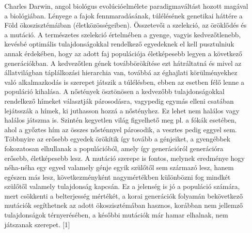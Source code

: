 


Charles Darwin, angol biológus evolúcióelmélete paradigmaváltást hozott magával a biológiában. 
Lényege a fajok fennmaradásának, túlélésének genetikai háttére a Föld ökoszisztémáiban 
(életközösségeiben). Összetevői a szelekció, az öröklődés és a mutáció. A természetes 
szelekció értelmében a gyenge, vagyis kedvezőtlenebb, kevésbé optimális tulajdonságokkal 
rendelkező egyedeknek el kell pusztulniuk annak érdekében, hogy az adott faj populációja 
életképesebb legyen a következő generációkban. A kedvezőtlen gének továbbörökítése ezt
hátráltatná és mivel az állatvilágban táplálkozási hierarchia van, továbbá az éghajlati 
körülményekhez való alkalmazkodás is szerepet játszik a túlélésben, ebben az esetben félő 
lenne a populáció kihalása. A nőstények ösztönösen a kedvezőbb tulajdonságokkal rendelkező 
hímeket választják párosodásra, vagypedig egymás elleni csatában lejátsszák a hímek, ki 
juthasson hozzá a nőstényhez. Ez lehet nem halálos vagy halálos játszma is. Szintén kegyetlen 
világ figyelhető meg pl. a fókák esetében, ahol a győztes hím az összes nősténnyel párosodik, 
a vesztes pedig eggyel sem. Többnyire az erősebb egyedek örökítik így tovább a génjeiket, a
gyengébbek fokozatosan elhullanak a populációból, amely így generációról generációra erősebb,
életképesebb lesz. A mutáció szerepe is fontos, melynek eredménye hogy néha-néha egy egyed
valamely génje egyik szülőtől sem származó lesz, hanem egészen más lesz, következményként
nagymértékben különbözni fog mindkét szülőtől valamely tulajdonság kapcsán. Ez a jelenség is 
jó a populáció számára, mert csökkenti a belterjesség mértékét, a korai generációk folyamán
bekövetkező mutációk segíthetnek az adott ökoszisztémában hasznos, korábban nem jellemző
tulajdonságok térnyerésében, a későbbi mutációk már hamar elhalnak, nem játszanak szerepet. [1]


